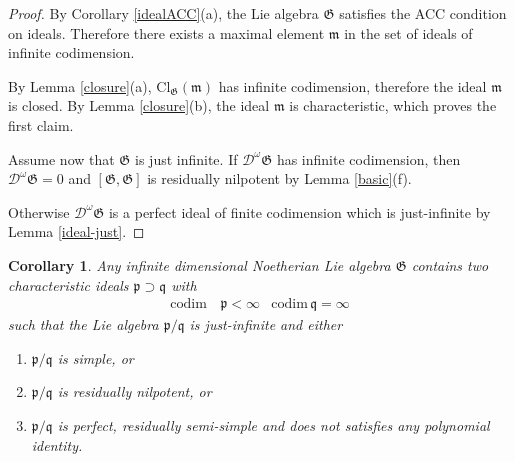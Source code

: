 \documentclass[11pt, letterpaper, reqno]{amsart}
\newtheorem{cor}[theorem]{Corollary}
\theoremstyle{definition}
\newcommand{\cD}{\mathscr D}
\newcommand{\fm}{\mathfrak{m}}
\newcommand{\fp}{\mathfrak{p}}
\newcommand{\fq}{\mathfrak{q}}
\newcommand{\fG}{\mathfrak{G}}
\newcommand{\Cl}{\mathrm{Cl}}
\newcommand{\codim}{\mathrm{codim}}
\begin{document}
\begin{proof} By Corollary \ref{idealACC}(a), the Lie algebra
$\fG$ satisfies the ACC condition on ideals. Therefore there exists  a maximal element 
$\fm$ in the set of  ideals 
of infinite codimension. 

By Lemma \ref{closure}(a), $\Cl_\fG(\fm)$ has infinite codimension, therefore the ideal $\fm$ is closed. By Lemma
\ref{closure}(b), the ideal $\fm$ is characteristic,
which proves the first claim.


Assume now that $\fG$ is just infinite.
If $\cD^\omega\fG$ has infinite codimension, then $\cD^\omega\fG=0$ and 
$[\fG,\fG]$ is residually 
nilpotent by Lemma \ref{basic}(f).

Otherwise $\cD^\omega\fG$ is a perfect ideal of finite codimension which is  just-infinite by Lemma \ref{ideal-just}.
\end{proof}



\begin{cor} \label{3cases} Any infinite dimensional Noetherian Lie algebra $\fG$ contains two characteristic ideals $\fp\supset\fq$ with
\begin{align*}
\codim&\, \fp<\infty & \codim\,\fq=\infty
\end{align*} 
\noindent such that the  Lie algebra $\fp/\fq$ 
is just-infinite and  either

\begin{enumerate}
\item[(type A)] $\fp/\fq$ is simple, or

\item[(type B)] $\fp/\fq$ is residually nilpotent, or

\item[(type C)] $\fp/\fq$ is perfect, residually semi-simple
and does not satisfies any polynomial identity.
\end{enumerate} 
\end{cor}
\end{document}
